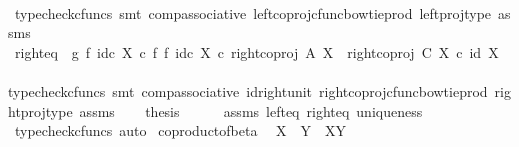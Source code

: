 \begin{isabellebody}
\ \ \ \ \isamarkupfalse%
\ {\isacharparenleft}{\kern0pt}typecheck{\isacharunderscore}{\kern0pt}cfuncs{\isacharcomma}{\kern0pt}\ smt\ comp{\isacharunderscore}{\kern0pt}associative{}\ left{\isacharunderscore}{\kern0pt}coproj{\isacharunderscore}{\kern0pt}cfunc{\isacharunderscore}{\kern0pt}bowtie{\isacharunderscore}{\kern0pt}prod\ left{\isacharunderscore}{\kern0pt}proj{\isacharunderscore}{\kern0pt}type\ assms{\isacharparenright}{\kern0pt}\isanewline
\ \ \isamarkupfalse%
\ right{\isacharunderscore}{\kern0pt}eq{\isacharcolon}{\kern0pt}\ {\isachardoublequoteopen}\ {\isacharparenleft}{\kern0pt}{\isacharparenleft}{\kern0pt}g\ {\isasymbowtie}\isactrlsub f\ id\isactrlsub c\ X{\isacharparenright}{\kern0pt}\ {\isasymcirc}\isactrlsub c\ {\isacharparenleft}{\kern0pt}f\ {\isasymbowtie}\isactrlsub f\ id\isactrlsub c\ X{\isacharparenright}{\kern0pt}{\isacharparenright}{\kern0pt}\ {\isasymcirc}\isactrlsub c\ right{\isacharunderscore}{\kern0pt}coproj\ A\ X\ {\isacharequal}{\kern0pt}\ right{\isacharunderscore}{\kern0pt}coproj\ C\ X\ {\isasymcirc}\isactrlsub c\ id\ X{\isachardoublequoteclose}\isanewline
\ \ \ \ \isamarkupfalse%
{\isacharparenleft}{\kern0pt}typecheck{\isacharunderscore}{\kern0pt}cfuncs{\isacharcomma}{\kern0pt}\ smt\ comp{\isacharunderscore}{\kern0pt}associative{}\ id{\isacharunderscore}{\kern0pt}right{\isacharunderscore}{\kern0pt}unit{}\ right{\isacharunderscore}{\kern0pt}coproj{\isacharunderscore}{\kern0pt}cfunc{\isacharunderscore}{\kern0pt}bowtie{\isacharunderscore}{\kern0pt}prod\ right{\isacharunderscore}{\kern0pt}proj{\isacharunderscore}{\kern0pt}type\ assms{\isacharparenright}{\kern0pt}\isanewline
\isanewline
\ \ \isamarkupfalse%
\ {\isacharquery}{\kern0pt}thesis\isanewline
\ \ \ \ \isamarkupfalse%
\ assms\ left{\isacharunderscore}{\kern0pt}eq\ right{\isacharunderscore}{\kern0pt}eq\ uniqueness\ \isamarkupfalse%
\ {\isacharparenleft}{\kern0pt}typecheck{\isacharunderscore}{\kern0pt}cfuncs{\isacharcomma}{\kern0pt}\ auto{\isacharparenright}{\kern0pt}\isanewline
{}\isamarkupfalse%
%
\endisatagproof
{\isafoldproof}%
%
\isadelimproof
\isanewline
%
\endisadelimproof
\isanewline
{}\isamarkupfalse%
\ coproduct{\isacharunderscore}{\kern0pt}of{\isacharunderscore}{\kern0pt}beta{\isacharcolon}{\kern0pt}\isanewline
\ \ {\isachardoublequoteopen}{\isasymbeta}\isactrlbsub X\isactrlesub \ {\isasymamalg}\ {\isasymbeta}\isactrlbsub Y\isactrlesub \ {\isacharequal}{\kern0pt}\ {\isasymbeta}\isactrlbsub X{\isasymCoprod}Y\isactrlesub {\isachardoublequoteclose}\isanewline

\end{isabellebody}
